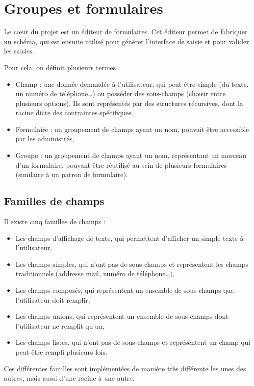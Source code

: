 \section{Groupes et formulaires}\label{sec:groupes-et-formulaires}

Le cœur du projet est un éditeur de formulaires.
Cet éditeur permet de fabriquer un schéma, qui est ensuite utilisé pour générer l'interface de saisie et pour valider les saisies.

Pour cela, on définit plusieurs termes :
\begin{itemize}
	\item Champ : une donnée demandée à l'utilisateur, qui peut être simple (du texte, un numéro de téléphone…) ou posséder des sous-champs (choisir entre plusieurs options).
	Ils sont représentés par des structures récursives, dont la racine dicte des contraintes spécifiques.
	\item Formulaire : un groupement de champs ayant un nom, pouvait être accessible par les administrés,
	\item Groupe : un groupement de champs ayant un nom, représentant un morceau d'un formulaire, pouvant être réutilisé au sein de plusieurs formulaires (similaire à un patron de formulaire).
\end{itemize}

\subsection{Familles de champs}\label{subsec:familles-de-champs}
Il existe cinq familles de champs :
\begin{itemize}
	\item Les champs d'affichage de texte, qui permettent d'afficher un simple texte à l'utilisateur,
	\item Les champs simples, qui n'ont pas de sous-champs et représentent les champs traditionnels (addresse mail, numéro de téléphone…),
	\item Les champs composés, qui représentent un ensemble de sous-champs que l'utilisateur doit remplir,
	\item Les champs unions, qui représentent un ensemble de sous-champs dont l'utilisateur ne remplit qu'un,
	\item Les champs listes, qui n'ont pas de sous-champs et représentent un champ qui peut être rempli plusieurs fois.
\end{itemize}
Ces différentes familles sont implémentées de manière très différente les unes des autres, mais aussi d'une racine à une autre.


